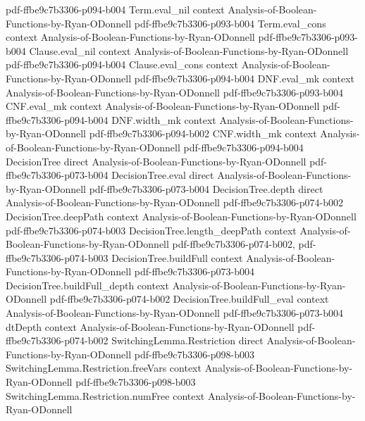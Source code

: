 \begin{theorem}
  {pdf-ffbe9c7b3306-p094-b004}
\proofstep
  {Term.eval_nil}
  {context}
  {Analysis-of-Boolean-Functions-by-Ryan-ODonnell}
  {pdf-ffbe9c7b3306-p093-b004}
\proofstep
  {Term.eval_cons}
  {context}
  {Analysis-of-Boolean-Functions-by-Ryan-ODonnell}
  {pdf-ffbe9c7b3306-p093-b004}
\proofstep
  {Clause.eval_nil}
  {context}
  {Analysis-of-Boolean-Functions-by-Ryan-ODonnell}
  {pdf-ffbe9c7b3306-p094-b004}
\proofstep
  {Clause.eval_cons}
  {context}
  {Analysis-of-Boolean-Functions-by-Ryan-ODonnell}
  {pdf-ffbe9c7b3306-p094-b004}
\proofstep
  {DNF.eval_mk}
  {context}
  {Analysis-of-Boolean-Functions-by-Ryan-ODonnell}
  {pdf-ffbe9c7b3306-p093-b004}
\proofstep
  {CNF.eval_mk}
  {context}
  {Analysis-of-Boolean-Functions-by-Ryan-ODonnell}
  {pdf-ffbe9c7b3306-p094-b004}
\proofstep
  {DNF.width_mk}
  {context}
  {Analysis-of-Boolean-Functions-by-Ryan-ODonnell}
  {pdf-ffbe9c7b3306-p094-b002}
\proofstep
  {CNF.width_mk}
  {context}
  {Analysis-of-Boolean-Functions-by-Ryan-ODonnell}
  {pdf-ffbe9c7b3306-p094-b004}
\proofstep
  {DecisionTree}
  {direct}
  {Analysis-of-Boolean-Functions-by-Ryan-ODonnell}
  {pdf-ffbe9c7b3306-p073-b004}
\proofstep
  {DecisionTree.eval}
  {direct}
  {Analysis-of-Boolean-Functions-by-Ryan-ODonnell}
  {pdf-ffbe9c7b3306-p073-b004}
\proofstep
  {DecisionTree.depth}
  {direct}
  {Analysis-of-Boolean-Functions-by-Ryan-ODonnell}
  {pdf-ffbe9c7b3306-p074-b002}
\proofstep
  {DecisionTree.deepPath}
  {context}
  {Analysis-of-Boolean-Functions-by-Ryan-ODonnell}
  {pdf-ffbe9c7b3306-p074-b003}
\proofstep
  {DecisionTree.length_deepPath}
  {context}
  {Analysis-of-Boolean-Functions-by-Ryan-ODonnell}
  {pdf-ffbe9c7b3306-p074-b002,
    pdf-ffbe9c7b3306-p074-b003}
\proofstep
  {DecisionTree.buildFull}
  {context}
  {Analysis-of-Boolean-Functions-by-Ryan-ODonnell}
  {pdf-ffbe9c7b3306-p073-b004}
\proofstep
  {DecisionTree.buildFull_depth}
  {context}
  {Analysis-of-Boolean-Functions-by-Ryan-ODonnell}
  {pdf-ffbe9c7b3306-p074-b002}
\proofstep
  {DecisionTree.buildFull_eval}
  {context}
  {Analysis-of-Boolean-Functions-by-Ryan-ODonnell}
  {pdf-ffbe9c7b3306-p073-b004}
\proofstep
  {dtDepth}
  {context}
  {Analysis-of-Boolean-Functions-by-Ryan-ODonnell}
  {pdf-ffbe9c7b3306-p074-b002}
\proofstep
  {SwitchingLemma.Restriction}
  {direct}
  {Analysis-of-Boolean-Functions-by-Ryan-ODonnell}
  {pdf-ffbe9c7b3306-p098-b003}
\proofstep
  {SwitchingLemma.Restriction.freeVars}
  {context}
  {Analysis-of-Boolean-Functions-by-Ryan-ODonnell}
  {pdf-ffbe9c7b3306-p098-b003}
\proofstep
  {SwitchingLemma.Restriction.numFree}
  {context}
  {Analysis-of-Boolean-Functions-by-Ryan-ODonnell}

\end{theorem}
